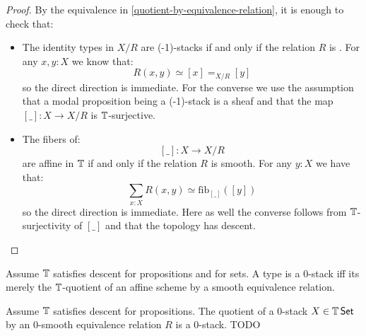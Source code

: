 \documentclass{article}
\begin{document}
\begin{proof}
By the equivalence in \ref{quotient-by-equivalence-relation}, it is enough to check that:
\begin{itemize}
\item The identity types in $X/R$ are 
 (-1)-stacks if and only if the relation $R$ is . For any $x,y:X$ we know that:
\[R(x,y) \simeq [x] =_{X/R}[y]\]
so the direct direction is immediate. For the converse we use the assumption that a modal proposition being a  (-1)-stack is a sheaf and that the map $[\_]:X\to X/R$ is $\mathbb{T}$-surjective.
\item The fibers of: 
\[[\_]:X\to X/R\] 
are affine in $\mathbb{T}$ if and only if the relation $R$ is smooth. For any $y:X$ we have that:
\[\sum_{x:X} R(x,y) \simeq \mathrm{fib}_{[\_]}([y])\]
so the direct direction is immediate. Here as well the converse follows from $\mathbb{T}$-surjectivity of $[\_]$ and that the topology has descent.
\end{itemize}
\end{proof}
\begin{corollary}
    Assume $\mathbb{T}$ satisfies descent for propositions and for sets.
    A type is a  0-stack iff its merely the $\mathbb{T}$-quotient of an affine scheme by a smooth equivalence relation.
\end{corollary}
\begin{theorem}{\label{thm:QuotientOfAlgebraicSpace}}
    Assume $\mathbb{T}$ satisfies descent for propositions. 
    The quotient of a  $0$-stack $X \in \mathbb{T} \operatorname{\mathsf {Set}}$ by an $0$-smooth equivalence relation $R$ is a  $0$-stack. TODO
\end{theorem}
\end{document}
